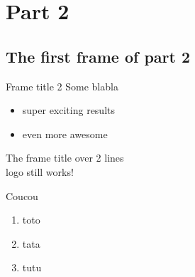 \documentclass[presentation, aspectratio=169]{beamer}
\begin{document}
\section{Part 2}
\label{sec:part2}
\subsection{The first frame of part 2}
\label{sec:first_frame2}
\begin{frame}{Frame title 2}
Some blabla
\begin{itemize}
\item super exciting results
\item even more awesome
\end{itemize}
\end{frame}

\begin{frame}{The frame title over 2 lines \\  logo still works!}
\begin{exampleblock}{Coucou}
\begin{enumerate}
\item toto
\item tata
\item tutu
\end{enumerate}
\end{exampleblock}
\end{frame}
\end{document}
